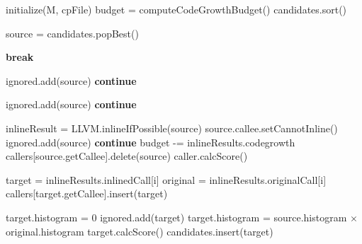 


  initialize(M, cpFile)\label{wl:init}\;
  budget = computeCodeGrowthBudget()\label{wl:budget}\;
  candidates.sort()\;

  {
    source = candidates.popBest()\label{wl:pop}\;

    {
      {\bf break}\;
    }

    {
      ignored.add(source)\;
      {\bf continue}\;
    }

    {
      ignored.add(source)\;
      {\bf continue}\;
    }
      
    inlineResult = LLVM.inlineIfPossible(source)\label{wl:inline}\;
    {
      source.callee.setCannotInline()\;
      ignored.add(source)\;
      {\bf continue}\;
    }
      budget -= inlineResults.codegrowth\label{wl:cost}\;
      callers[source.getCallee].delete(source)\label{wl:delcaller}\;
      {
        caller.calcScore()\;
      }
      {
        target = inlineResults.inlinedCall[i]\label{wl:newcand}\;
        original = inlineResults.originalCall[i]\label{wl:orig}\;
        callers[target.getCallee].insert(target)\;

        {
          target.histogram = 0\;
          ignored.add(target)\;
        }
        {
          target.histogram = source.histogram $\times$ original.histogram\label{wl:newhist}\;
          target.calcScore()\;
          candidates.insert(target)\;
        } %
      } %
 }
